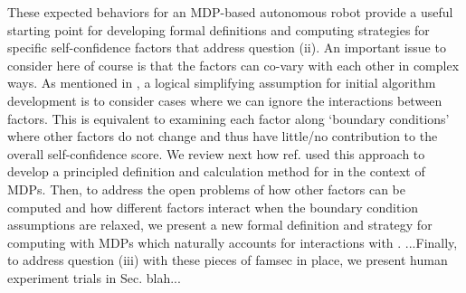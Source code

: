 These expected behaviors for an MDP-based autonomous robot provide a useful starting point for developing formal definitions and computing strategies for specific self-confidence factors that address question (ii). 
An important issue to consider here of course is that the factors can co-vary with each other in complex ways. 
As mentioned in \cite{Aitken2016-cv}, a logical simplifying assumption for initial algorithm development is to consider cases where we can ignore the interactions between factors. 
This is equivalent to examining each factor along `boundary conditions' where other factors do not change and thus have little/no contribution to the overall self-confidence score. 
We review next how ref. \cite{Aitken2016-cv} used this approach to develop a principled definition and calculation method for \xO{} in the context of MDPs. Then, to address the open problems of how other factors can be computed and how different factors interact when the boundary condition assumptions are relaxed, we present a new formal definition and strategy for computing \xQ{} with MDPs which naturally accounts for interactions with \xO{}.  %
 ...Finally, to address question (iii) with these pieces of famsec in place, we present human experiment trials in Sec. blah... 

